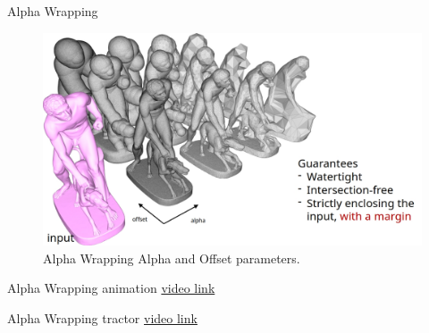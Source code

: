 \documentclass[10pt]{beamer}
\begin{document}
\begin{frame}{Alpha Wrapping}
  \begin{figure}[H]
    \centering
    \includegraphics[width=1.1\textwidth]{images/alpha-wrapping4.jpg}
    \caption{Alpha Wrapping Alpha and Offset parameters.}
\end{figure}
\end{frame}

\begin{frame}{Alpha Wrapping animation}
  \href{https://youtu.be/xIIDolWCrgU}{video link}
  \begin{center}
\end{center}
\end{frame}

\begin{frame}{Alpha Wrapping tractor}
  \href{https://youtu.be/HG9oHA2NJMM}{video link}
  \begin{center}
\end{center}
\end{frame}
\end{document}
